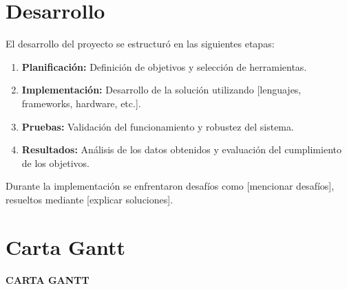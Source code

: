 \documentclass[a4paper,12pt]{article}
\begin{document}
\section{Desarrollo}
El desarrollo del proyecto se estructuró en las siguientes etapas:
\begin{enumerate}
    \item \textbf{Planificación:} Definición de objetivos y selección de herramientas.
    \item \textbf{Implementación:} Desarrollo de la solución utilizando [lenguajes, frameworks, hardware, etc.].
    \item \textbf{Pruebas:} Validación del funcionamiento y robustez del sistema.
    \item \textbf{Resultados:} Análisis de los datos obtenidos y evaluación del cumplimiento de los objetivos.
\end{enumerate}
Durante la implementación se enfrentaron desafíos como [mencionar desafíos], resueltos mediante [explicar soluciones].

\section{Carta Gantt}


\begin{center}
\huge\textbf{CARTA GANTT}
\end{center}
\end{document}
